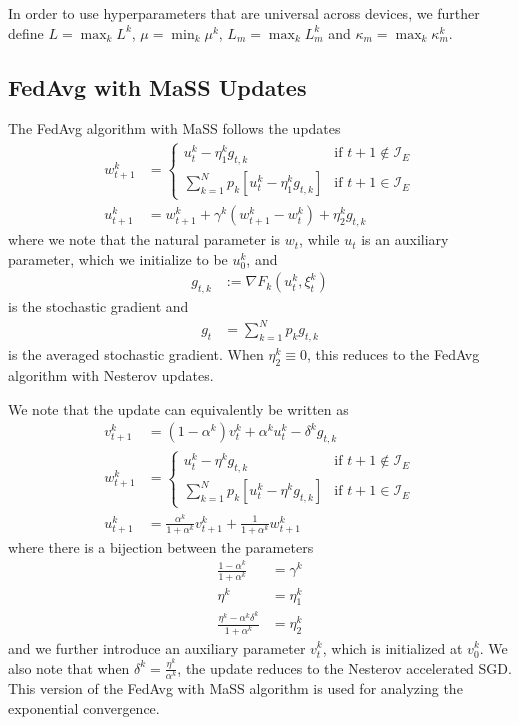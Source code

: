 In order to use hyperparameters that are universal across devices,
we further define $L=\max_{k}L^{k}$, $\mu=\min_{k}\mu^{k}$, $L_{m}=\max_{k}L_{m}^{k}$
and $\kappa_{m}=\max_{k}\kappa_{m}^{k}$. 

\subsection{FedAvg with MaSS Updates}

The FedAvg algorithm with MaSS follows the updates
\begin{align*}
w_{t+1}^{k} & =\begin{cases}
u_{t}^{k}-\eta_{1}^{k}g_{t,k} & \text{if }t+1\notin\mathcal{I}_{E}\\
\sum_{k=1}^{N}p_{k}\left[u_{t}^{k}-\eta_{1}^{k}g_{t,k}\right] & \text{if }t+1\in\mathcal{I}_{E}
\end{cases}\\
u_{t+1}^{k} & =w_{t+1}^{k}+\gamma^{k}(w_{t+1}^{k}-w_{t}^{k})+\eta_{2}^{k}g_{t,k}
\end{align*}
where we note that the natural parameter is $w_{t}$, while $u_{t}$
is an auxiliary parameter, which we initialize to be $u_{0}^{k}$,
and 
\begin{align*}
g_{t,k} & :=\nabla F_{k}(u_{t}^{k},\xi_{t}^{k})
\end{align*}
is the stochastic gradient and 
\begin{align*}
g_{t} & =\sum_{k=1}^{N}p_{k}g_{t,k}
\end{align*}
is the averaged stochastic gradient. When $\eta_{2}^{k}\equiv0$,
this reduces to the FedAvg algorithm with Nesterov updates.

We note that the update can equivalently be written as 
\begin{align*}
v_{t+1}^{k} & =(1-\alpha^{k})v_{t}^{k}+\alpha^{k}u_{t}^{k}-\delta^{k}g_{t,k}\\
w_{t+1}^{k} & =\begin{cases}
u_{t}^{k}-\eta^{k}g_{t,k} & \text{if }t+1\notin\mathcal{I}_{E}\\
\sum_{k=1}^{N}p_{k}\left[u_{t}^{k}-\eta^{k}g_{t,k}\right] & \text{if }t+1\in\mathcal{I}_{E}
\end{cases}\\
u_{t+1}^{k} & =\frac{\alpha^{k}}{1+\alpha^{k}}v_{t+1}^{k}+\frac{1}{1+\alpha^{k}}w_{t+1}^{k}
\end{align*}
where there is a bijection between the parameters 
\begin{align*}
\frac{1-\alpha^{k}}{1+\alpha^{k}} & =\gamma^{k}\\
\eta^{k} & =\eta_{1}^{k}\\
\frac{\eta^{k}-\alpha^{k}\delta^{k}}{1+\alpha^{k}} & =\eta_{2}^{k}
\end{align*}
and we further introduce an auxiliary parameter $v_{t}^{k}$, which
is initialized at $v_{0}^{k}$. We also note that when $\delta^{k}=\frac{\eta^{k}}{\alpha^{k}}$,
the update reduces to the Nesterov accelerated SGD. This version of
the FedAvg with MaSS algorithm is used for analyzing the exponential
convergence. 

